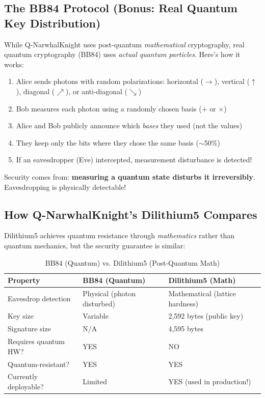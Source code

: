\documentclass[11pt,a4paper]{article}
\begin{document}
\subsection{The BB84 Protocol (Bonus: Real Quantum Key Distribution)}

While Q-NarwhalKnight uses post-quantum \textit{mathematical} cryptography, real quantum cryptography (BB84) uses \textit{actual quantum particles}. Here's how it works:

\begin{tcolorbox}[colback=brightgreen!10,colframe=brightgreen,title=\textbf{BB84 in 5 Steps}]
\begin{enumerate}
    \item Alice sends photons with random polarizations: horizontal ($\rightarrow$), vertical ($\uparrow$), diagonal ($\nearrow$), or anti-diagonal ($\searrow$)
    \item Bob measures each photon using a randomly chosen basis ($+$ or $\times$)
    \item Alice and Bob publicly announce which \textit{bases} they used (not the values)
    \item They keep only the bits where they chose the same basis ($\sim$50\%)
    \item If an eavesdropper (Eve) intercepted, measurement disturbance is detected!
\end{enumerate}
Security comes from: \textbf{measuring a quantum state disturbs it irreversibly}. Eavesdropping is physically detectable!
\end{tcolorbox}

\subsection{How Q-NarwhalKnight's Dilithium5 Compares}

Dilithium5 achieves quantum resistance through \textit{mathematics} rather than quantum mechanics, but the security guarantee is similar:

\begin{table}[H]
\centering
\caption{BB84 (Quantum) vs. Dilithium5 (Post-Quantum Math)}
\begin{tabular}{@{}lll@{}}
\toprule
\textbf{Property} & \textbf{BB84 (Quantum)} & \textbf{Dilithium5 (Math)} \\
\midrule
Eavesdrop detection & Physical (photon disturbed) & Mathematical (lattice hardness) \\
Key size & Variable & 2,592 bytes (public key) \\
Signature size & N/A & 4,595 bytes \\
Requires quantum HW? & YES & NO \\
Quantum-resistant? & YES & YES \\
Currently deployable? & Limited & YES (used in production!) \\
\bottomrule
\end{tabular}
\end{table}
\end{document}
